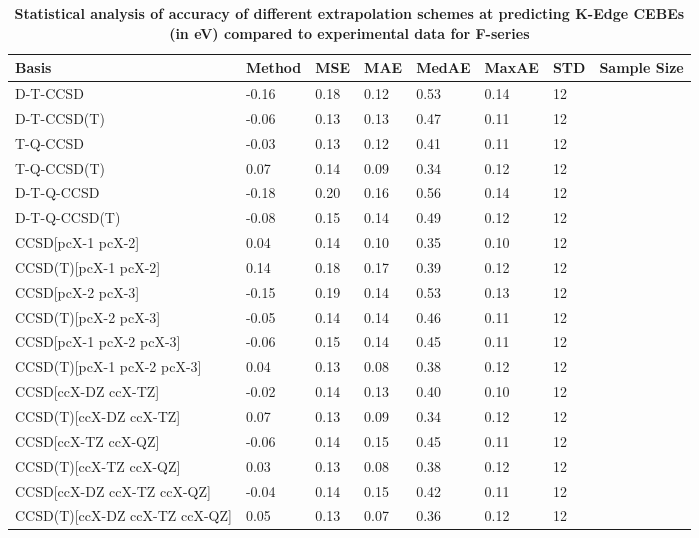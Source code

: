 \begin{table}
  \caption{\textbf{Statistical analysis of accuracy of different extrapolation schemes at predicting K-Edge CEBEs (in eV) compared to experimental data for F-series}}
  \label{tbl:extrap-scheme-summary-f}
  \begin{tabular}{l l l l l l l l }
    \toprule
    \textbf{Basis} & \textbf{Method} & \textbf{MSE} & \textbf{MAE} & \textbf{MedAE} & \textbf{MaxAE} & \textbf{STD} & \textbf{Sample Size} \\ 
    \midrule
    D-T-CCSD & -0.16 & 0.18 & 0.12 & 0.53 & 0.14 & 12 \\ 
    D-T-CCSD(T) & -0.06 & 0.13 & 0.13 & 0.47 & 0.11 & 12 \\ 
    T-Q-CCSD & -0.03 & 0.13 & 0.12 & 0.41 & 0.11 & 12 \\ 
    T-Q-CCSD(T) & 0.07 & 0.14 & 0.09 & 0.34 & 0.12 & 12 \\ 
    D-T-Q-CCSD & -0.18 & 0.20 & 0.16 & 0.56 & 0.14 & 12 \\ 
    D-T-Q-CCSD(T) & -0.08 & 0.15 & 0.14 & 0.49 & 0.12 & 12 \\ 
    CCSD[pcX-1 pcX-2] & 0.04 & 0.14 & 0.10 & 0.35 & 0.10 & 12 \\ 
    CCSD(T)[pcX-1 pcX-2] & 0.14 & 0.18 & 0.17 & 0.39 & 0.12 & 12 \\ 
    CCSD[pcX-2 pcX-3] & -0.15 & 0.19 & 0.14 & 0.53 & 0.13 & 12 \\ 
    CCSD(T)[pcX-2 pcX-3] & -0.05 & 0.14 & 0.14 & 0.46 & 0.11 & 12 \\ 
    CCSD[pcX-1 pcX-2 pcX-3] & -0.06 & 0.15 & 0.14 & 0.45 & 0.11 & 12 \\ 
    CCSD(T)[pcX-1 pcX-2 pcX-3] & 0.04 & 0.13 & 0.08 & 0.38 & 0.12 & 12 \\ 
    CCSD[ccX-DZ ccX-TZ] & -0.02 & 0.14 & 0.13 & 0.40 & 0.10 & 12 \\ 
    CCSD(T)[ccX-DZ ccX-TZ] & 0.07 & 0.13 & 0.09 & 0.34 & 0.12 & 12 \\ 
    CCSD[ccX-TZ ccX-QZ] & -0.06 & 0.14 & 0.15 & 0.45 & 0.11 & 12 \\ 
    CCSD(T)[ccX-TZ ccX-QZ] & 0.03 & 0.13 & 0.08 & 0.38 & 0.12 & 12 \\ 
    CCSD[ccX-DZ ccX-TZ ccX-QZ] & -0.04 & 0.14 & 0.15 & 0.42 & 0.11 & 12 \\ 
    CCSD(T)[ccX-DZ ccX-TZ ccX-QZ] & 0.05 & 0.13 & 0.07 & 0.36 & 0.12 & 12 \\ 
    \bottomrule
  \end{tabular}
\end{table}
